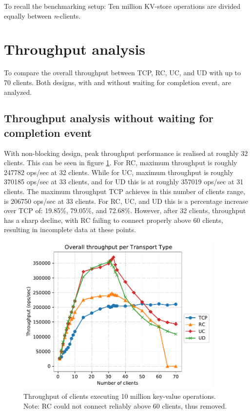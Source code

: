 To recall the benchmarking setup:
Ten million KV-store operations are divided equally between \textit{n}-clients.

\section{Throughput analysis}\label{sec:throughput-analysis}
To compare the overall throughput between TCP, RC, UC, and UD with up to 70 clients.
Both designs, with and without waiting for completion event, are analyzed.

\subsection{Throughput analysis without waiting for completion event}
With non-blocking design, peak throughput performance is realised at roughly 32 clients.
This can be seen in figure \ref{fig:throughput-70}.
For RC, maximum throughput is roughly 247782 ops/sec at 32 clients.
While for UC, maximum throughput is roughly 370185 ops/sec at 33 clients, and for UD this is at roughly 357019 ops/sec at 31 clients.
The maximum throughput TCP achieves in this number of clients range, is 206750 ops/sec at 33 clients.
For RC, UC, and UD this is a percentage increase over TCP of: 19.85\%, 79.05\%, and 72.68\%.
However, after 32 clients, throughput has a sharp decline, with RC failing to connect properly above 60 clients, resulting in incomplete data at these points.
\begin{figure}
    \centering
    \includegraphics[height=8cm]{figures/PDF/Throughput_70}
    \caption[Throughput of clients executing 10 million key-value operations.]{Throughput of clients executing 10 million key-value operations. Note: RC could not connect reliably above 60 clients, thus removed.}
    \label{fig:throughput-70}
\end{figure}

